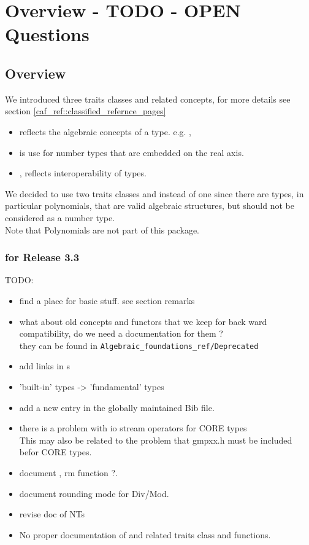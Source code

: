 \section{Overview - TODO - OPEN Questions}

\subsection{Overview}

We introduced three traits classes and related concepts, for more details see 
section \ref{caf_ref::classified_refernce_pages}
\begin{itemize}
\item {} reflects the algebraic concepts of a 
      type. e.g. , 
\item {} is use for number types that are embedded on 
      the real axis. 
\item {}, reflects interoperability of types. 
\end{itemize}

We decided to use two traits classes  
and  instead of one  since there are 
types, in particular polynomials, that are valid algebraic structures, 
but should not be considered as a number type.\\
Note that Polynomials are not part of this package. 

\subsubsection{for Release 3.3}

TODO:
\begin{itemize}
\item find a place for basic stuff. see section remarks
\item what about old concepts and functors that we keep for back ward 
      compatibility, do we need a documentation for them ? \\
      they can be found in {\tt Algebraic\_foundations\_ref/Deprecated}
\item add links in s
\item 'built-in' types -> 'fundamental' types 
\item add a new entry in the globally maintained Bib file.
\item there is a problem with io stream operators for CORE types \\
      This may also be related to the problem that gmpxx.h must be included 
      befor CORE types. 
\item document , rm function ?.
\item document rounding mode for Div/Mod. 
\item revise doc of NTs
\item No proper documentation of  and related traits class 
      and functions. 
\end{itemize}


